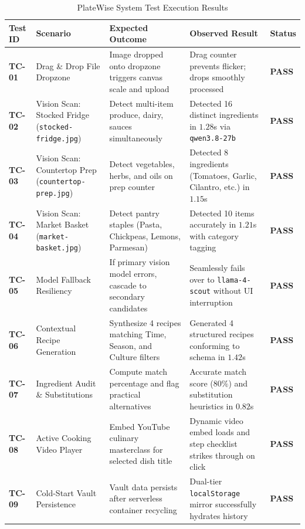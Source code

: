 \begin{table}[H]
\centering
\caption{PlateWise System Test Execution Results}
\label{tab:testcases}
\small
\begin{tabular}{|p{1.2cm}|p{3.2cm}|p{3.8cm}|p{3.8cm}|p{1.2cm}|}
\hline
\textbf{Test ID} & \textbf{Scenario} & \textbf{Expected Outcome} & \textbf{Observed Result} & \textbf{Status} \\ \hline
\textbf{TC-01} & Drag \& Drop File Dropzone & Image dropped onto dropzone triggers canvas scale and upload & Drag counter prevents flicker; drops smoothly processed & \textbf{PASS} \\ \hline
\textbf{TC-02} & Vision Scan: Stocked Fridge (\texttt{stocked-fridge.jpg}) & Detect multi-item produce, dairy, sauces simultaneously & Detected 16 distinct ingredients in $1.28$s via \texttt{qwen3.8-27b} & \textbf{PASS} \\ \hline
\textbf{TC-03} & Vision Scan: Countertop Prep (\texttt{countertop-prep.jpg}) & Detect vegetables, herbs, and oils on prep counter & Detected 8 ingredients (Tomatoes, Garlic, Cilantro, etc.) in $1.15$s & \textbf{PASS} \\ \hline
\textbf{TC-04} & Vision Scan: Market Basket (\texttt{market-basket.jpg}) & Detect pantry staples (Pasta, Chickpeas, Lemons, Parmesan) & Detected 10 items accurately in $1.21$s with category tagging & \textbf{PASS} \\ \hline
\textbf{TC-05} & Model Fallback Resiliency & If primary vision model errors, cascade to secondary candidates & Seamlessly fails over to \texttt{llama-4-scout} without UI interruption & \textbf{PASS} \\ \hline
\textbf{TC-06} & Contextual Recipe Generation & Synthesize 4 recipes matching Time, Season, and Culture filters & Generated 4 structured recipes conforming to schema in $1.42$s & \textbf{PASS} \\ \hline
\textbf{TC-07} & Ingredient Audit \& Substitutions & Compute match percentage and flag practical alternatives & Accurate match score ($80\%$) and substitution heuristics in $0.82$s & \textbf{PASS} \\ \hline
\textbf{TC-08} & Active Cooking Video Player & Embed YouTube culinary masterclass for selected dish title & Dynamic video embed loads and step checklist strikes through on click & \textbf{PASS} \\ \hline
\textbf{TC-09} & Cold-Start Vault Persistence & Vault data persists after serverless container recycling & Dual-tier \texttt{localStorage} mirror successfully hydrates history & \textbf{PASS} \\ \hline
\end{tabular}
\end{table}

